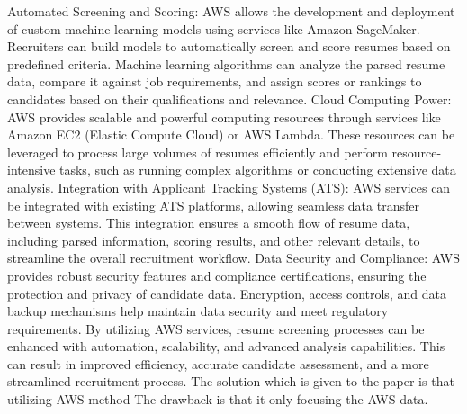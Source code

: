 \documentclass[12 pt, oneside]{book}
\begin{document}
\newline
Automated Screening and Scoring: AWS allows the development and deployment of custom machine learning models using services like Amazon SageMaker. Recruiters can build models to automatically screen and score resumes based on predefined criteria. Machine learning algorithms can analyze the parsed resume data, compare it against job requirements, and assign scores or rankings to candidates based on their qualifications and relevance.
\newline
Cloud Computing Power: AWS provides scalable and powerful computing resources through services like Amazon EC2 (Elastic Compute Cloud) or AWS Lambda. These resources can be leveraged to process large volumes of resumes efficiently and perform resource-intensive tasks, such as running complex algorithms or conducting extensive data analysis.
\newline
Integration with Applicant Tracking Systems (ATS): AWS services can be integrated with existing ATS platforms, allowing seamless data transfer between systems. This integration ensures a smooth flow of resume data, including parsed information, scoring results, and other relevant details, to streamline the overall recruitment workflow.
\newline
Data Security and Compliance: AWS provides robust security features and compliance certifications, ensuring the protection and privacy of candidate data. Encryption, access controls, and data backup mechanisms help maintain data security and meet regulatory requirements.
\newline
By utilizing AWS services, resume screening processes can be enhanced with automation, scalability, and advanced analysis capabilities. This can result in improved efficiency, accurate candidate assessment, and a more streamlined recruitment process.
The solution which is given to the paper is that utilizing AWS method The drawback is that it only focusing the AWS data.
\end{document}
